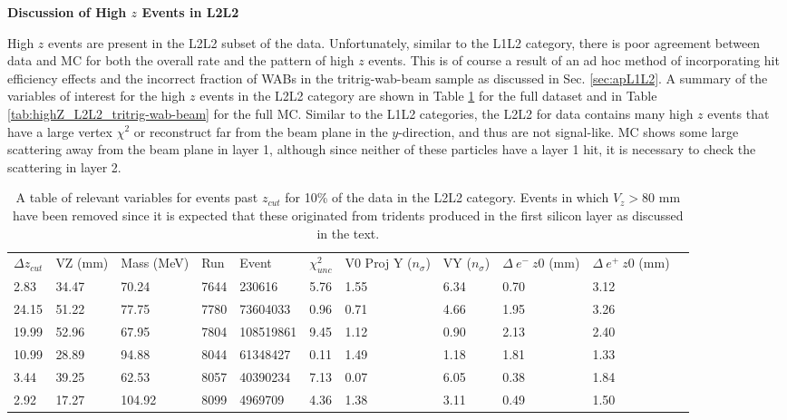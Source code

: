 \clearpage

\textbf{Discussion of High $z$ Events in L2L2}

High $z$ events are present in the L2L2 subset of the data. Unfortunately, similar to the L1L2 category, there is poor agreement between data and MC for both the overall rate and the pattern of high $z$ events. This is of course a result of an ad hoc method of incorporating hit efficiency effects and the incorrect fraction of WABs in the tritrig-wab-beam sample as discussed in Sec. \ref{sec:apL1L2}. A summary of the variables of interest for the high $z$ events in the L2L2 category are shown in Table \ref{tab:highZ_L2L2_unblind} for the full dataset and in Table \ref{tab:highZ_L2L2_tritrig-wab-beam} for the full MC. Similar to the L1L2 categories, the L2L2 for data contains many high $z$ events that have a large vertex $\chi^2$ or reconstruct far from the beam plane in the $y$-direction, and thus are not signal-like. MC shows some large scattering away from the beam plane in layer 1, although since neither of these particles have a layer 1 hit, it is necessary to check the scattering in layer 2.


\begin{table}[t]
\centering
\tabcolsep=0.09cm
\begin{tabular}{lllllllllll}

\hline

$\Delta z_{cut}$ & VZ (mm) & Mass (MeV) & Run & Event & $\chi^2_{unc}$ & V0 Proj Y ($n_{\sigma}$) & VY ($n_{\sigma}$) & $\Delta \ e^- \ z0$ (mm) & $\Delta \ e^+ \ z0$ (mm) \\
2.83 & 34.47 & 70.24 & 7644 & 230616 & 5.76 & 1.55 & 6.34 & 0.70 & 3.12 \\ 
24.15 & 51.22 & 77.75 & 7780 & 73604033 & 0.96 & 0.71 & 4.66 & 1.95 & 3.26 \\
19.99 & 52.96 & 67.95 & 7804 & 108519861 & 9.45 & 1.12 & 0.90 & 2.13 & 2.40 \\ 
10.99 & 28.89 & 94.88 & 8044 & 61348427 & 0.11 & 1.49 & 1.18 & 1.81 & 1.33 \\ 3.44 & 39.25 & 62.53 & 8057 & 40390234 & 7.13 & 0.07 & 6.05 & 0.38 & 1.84 \\ 
2.92 & 17.27 & 104.92 & 8099 & 4969709 & 4.36 & 1.38 & 3.11 & 0.49 & 1.50 \\ 
\hline

\hline
\end{tabular}
\caption{A table of relevant variables for events past $z_{cut}$ for 10\% of the data in the L2L2 category. Events in which $V_z>80$ mm have been removed since it is expected that these originated from tridents produced in the first silicon layer as discussed in the text.}
\label{tab:highZ_L2L2_unblind}
\end{table}


